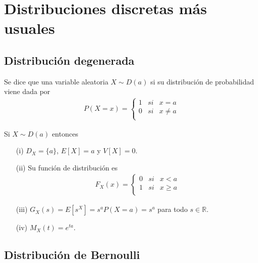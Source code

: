 \chapter{Distribuciones discretas más usuales}


\section{Distribución degenerada}

\begin{defi}
    Se dice que una variable aleatoria $X \sim D(a)$ si su distribución de probabilidad viene dada por
    \begin{align*}
        P(X = x) = \left\{ \begin{array}{lcc}
                               1 & si & x = a      \\
                               0 & si & x \not = a \\
                           \end{array}
        \right.
    \end{align*}
\end{defi}

\begin{obs}
    Si $X \sim D(a)$ entonces
    \begin{enumerate}
        \item[(i)] $D_X = \{a\}$, $E[X] = a$ y $V[X] = 0$.
        \item[(ii)] Su función de distribución es
              \begin{align*}
                  F_X(x) = \left\{ \begin{array}{lcc}
                                       0 & si & x < a   \\
                                       1 & si & x \ge a \\
                                   \end{array}
                  \right.
              \end{align*}
        \item[(iii)] $G_X(s) = E[s^X] = s^aP(X = a) = s^a$ para todo $s \in \mathbb{R}$.
        \item[(iv)] $M_X(t) = e^{ta}$.
    \end{enumerate}
\end{obs}

\section{Distribución de Bernoulli}

